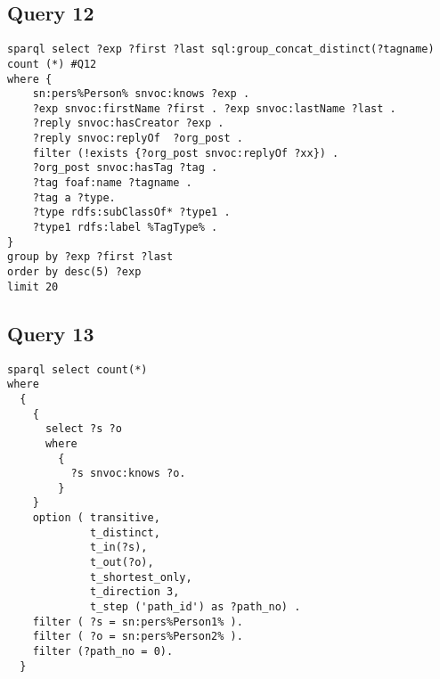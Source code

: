 \subsection{Query 12}
{\footnotesize
\begin{verbatim}
sparql select ?exp ?first ?last sql:group_concat_distinct(?tagname) count (*) #Q12
where {
    sn:pers%Person% snvoc:knows ?exp .
    ?exp snvoc:firstName ?first . ?exp snvoc:lastName ?last .
    ?reply snvoc:hasCreator ?exp .
    ?reply snvoc:replyOf  ?org_post .
    filter (!exists {?org_post snvoc:replyOf ?xx}) .
    ?org_post snvoc:hasTag ?tag .
    ?tag foaf:name ?tagname .
    ?tag a ?type.
    ?type rdfs:subClassOf* ?type1 .
    ?type1 rdfs:label %TagType% .
}
group by ?exp ?first ?last
order by desc(5) ?exp
limit 20
\end{verbatim}
}


\subsection{Query 13} 
{\footnotesize
\begin{verbatim}
sparql select count(*) 
where
  {
    {
      select ?s ?o
      where
        {
          ?s snvoc:knows ?o.
        }
    }
    option ( transitive,
             t_distinct,
             t_in(?s),
             t_out(?o),
             t_shortest_only,
             t_direction 3,
             t_step ('path_id') as ?path_no) .
    filter ( ?s = sn:pers%Person1% ).
    filter ( ?o = sn:pers%Person2% ).
    filter (?path_no = 0).
  }
\end{verbatim}
}


